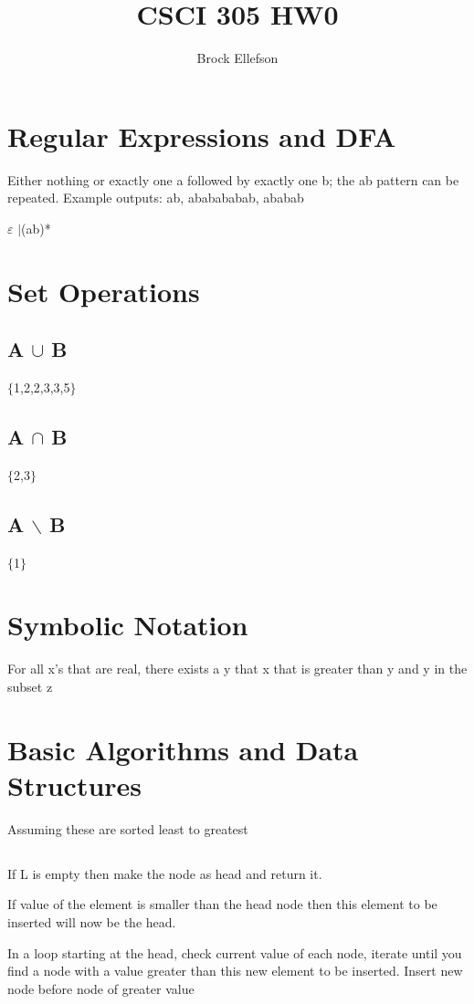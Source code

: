 \documentclass[11pt]{article} %
\title{CSCI 305 HW0}
\author{Brock Ellefson}
\begin{document}
\maketitle

\section{Regular Expressions and DFA}
Either nothing or exactly one a followed by exactly one b; the ab pattern can be repeated. Example outputs: ab, ababababab, ababab

$\varepsilon$
$\vert$(ab)*
\section{Set Operations}
	\subsection{A $\cup$ B}
	$\{$1,2,2,3,3,5$\}$
	\subsection{A $\cap$ B}
	$\{$2,3$\}$
	\subsection{A $\backslash$ B}
	$\{$1$\}$
\section{Symbolic Notation}
For all x's that are real, there exists a y that x that is greater than y and y in the subset z
\section{Basic Algorithms and Data Structures}
Assuming these are sorted least to greatest
\subsection {}
If L is empty then make the node as head and return it.


If value of the element is smaller than the head node then this element to be inserted will now be the head.


In a loop starting at the head, check current value of each node, iterate until you find a node with a value greater than this new element to be inserted. Insert new node before node of greater value
\end{document}
